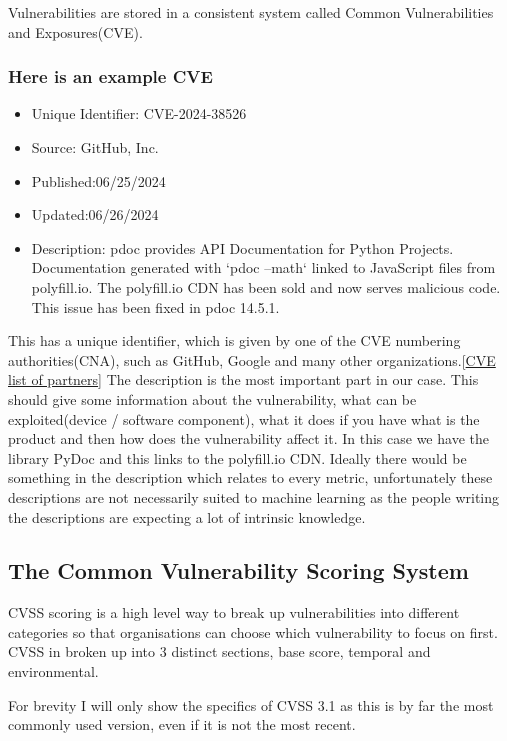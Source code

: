 \documentclass[12pt]{article}
\begin{document}
Vulnerabilities are stored in a consistent system called Common Vulnerabilities and Exposures(CVE).

\subsubsection*{Here is an example CVE}
\begin{itemize}
	\item   Unique Identifier: CVE-2024-38526
	\item   Source: GitHub, Inc.
	\item   Published:06/25/2024
	\item   Updated:06/26/2024

	\item   Description: pdoc provides API Documentation for Python Projects. Documentation generated with `pdoc --math` linked to JavaScript files
	      from polyfill.io. The polyfill.io CDN has been sold and now serves malicious code. This issue has been fixed in pdoc 14.5.1.

\end{itemize}

This has a unique identifier, which is given by one of the CVE numbering authorities(CNA), such as GitHub, Google and many other
organizations.[\href{https://www.cve.org/PartnerInformation/ListofPartners}{CVE list of partners}] The description is the most important part in our
case. This should give some information about the vulnerability, what can be exploited(device / software component), what it does if  you have what is
the product and then how does the vulnerability affect it. In this case we have the library PyDoc and this links to the polyfill.io CDN. Ideally there
would be something in the description which relates to every metric, unfortunately these descriptions are not necessarily suited to machine learning
as the people writing the descriptions are expecting a lot of intrinsic knowledge.

\subsection*{The Common Vulnerability Scoring System}

CVSS scoring is a high level way to break up vulnerabilities into different categories so that organisations can choose which vulnerability to focus
on first. CVSS in broken up into 3 distinct sections, base score, temporal and environmental.

For brevity I will only show the specifics of CVSS 3.1 as this is by far the most commonly used version, even if it is not the most recent.
\end{document}
